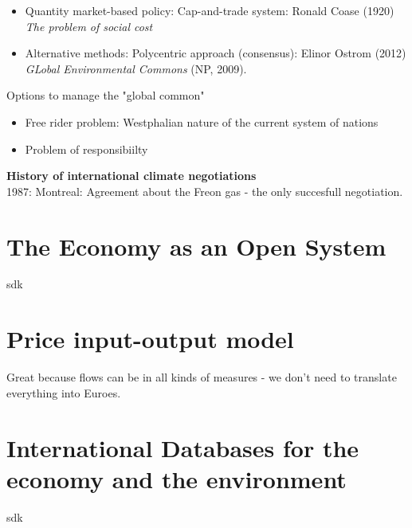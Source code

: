 \begin{multicols}{2}
\begin{itemize}
\begin{itemize}
    \item Quantity market-based policy: Cap-and-trade system: Ronald Coase (1920) \textit{The problem of social cost}
    \item Alternative methods: Polycentric approach (consensus): Elinor Ostrom (2012) \textit{GLobal Environmental Commons} (NP, 2009).
  \end{itemize}
  Options to manage the "global common"
  \begin{itemize}
    \item Free rider problem: Westphalian nature of the current system of nations
    \item Problem of responsibiilty
  \end{itemize}
\end{itemize}
\textbf{History of international climate negotiations}\\
1987: Montreal: Agreement about the Freon gas - the only succesfull negotiation.
\end{multicols}

\section{The Economy as an Open System} %
\begin{multicols}{2}
sdk


\end{multicols}

\section{Price input-output model} %
\begin{multicols}{2}
Great because flows can be in all kinds of measures - we don't need to translate everything into Euroes.


\end{multicols}
\section{International Databases for the economy and the environment} %
\begin{multicols}{2}
sdk


\end{multicols}

